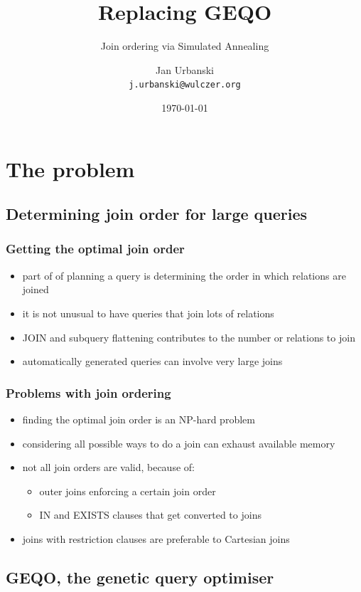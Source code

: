 \documentclass{beamer}
\title{Replacing GEQO}
\subtitle{Join ordering via Simulated Annealing}
\author{Jan Urbanski \\ \texttt{j.urbanski@wulczer.org}}
\institute{University of Warsaw / Flumotion}
\date{\today}
\begin{document}
\frame{\titlepage}

\begin{frame}
  \tableofcontents
\end{frame}

\section{The problem}
\subsection{Determining join order for large queries}

\begin{frame}
  \frametitle{Getting the optimal join order}

  \begin{itemize}
  \item part of of planning a query is determining the order in which relations
    are joined
  \item it is not unusual to have queries that join lots of relations
  \item JOIN and subquery flattening contributes to the number or relations to
    join
  \item automatically generated queries can involve very large joins
  \end{itemize}
\end{frame}

\begin{frame}
  \frametitle{Problems with join ordering}

  \begin{itemize}
  \item finding the optimal join order is an NP-hard problem
  \item considering all possible ways to do a join can exhaust available memory
  \item not all join orders are valid, because of:
    \begin{itemize}
    \item outer joins enforcing a certain join order
    \item IN and EXISTS clauses that get converted to joins
    \end{itemize}
  \item joins with restriction clauses are preferable to Cartesian joins
  \end{itemize}
\end{frame}

\subsection{GEQO, the genetic query optimiser}
\end{document}
